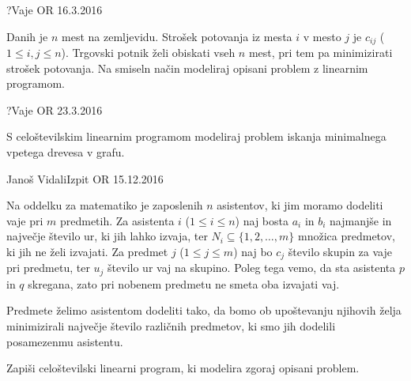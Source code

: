 \begin{naloga}{?}{Vaje OR 16.3.2016}
\begin{vprasanje}
Danih je $n$ mest na zemljevidu.
Strošek potovanja iz mesta $i$ v mesto $j$ je $c_{ij}$ ($1 \le i, j \le n$).
Trgovski potnik želi obiskati vseh $n$ mest,
pri tem pa minimizirati strošek potovanja.
Na smiseln način modeliraj opisani problem z linearnim programom.
\end{vprasanje}
\begin{odgovor}
\end{odgovor}
\end{naloga}


\begin{naloga}{?}{Vaje OR 23.3.2016}
\begin{vprasanje}
S celoštevilskim linearnim programom
modeliraj problem iskanja minimalnega vpetega drevesa v grafu.
\end{vprasanje}
\begin{odgovor}
\end{odgovor}
\end{naloga}


\begin{naloga}{Janoš Vidali}{Izpit OR 15.12.2016}
\begin{vprasanje}
Na oddelku za matematiko je zaposlenih $n$ asistentov,
ki jim moramo dodeliti vaje pri $m$ predmetih.
Za asistenta $i$ ($1 \le i \le n$) naj bosta $a_i$ in $b_i$
najmanjše in največje število ur, ki jih lahko izvaja,
ter $N_i \subseteq \{1, 2, \dots, m\}$ množica predmetov,
ki jih ne želi izvajati.
Za predmet $j$ ($1 \le j \le m$)
naj bo $c_j$ število skupin za vaje pri predmetu,
ter $u_j$ število ur vaj na skupino.
Poleg tega vemo, da sta asistenta $p$ in $q$ skregana,
zato pri nobenem predmetu ne smeta oba izvajati vaj.

Predmete želimo asistentom dodeliti tako,
da bomo ob upoštevanju njihovih želja
minimizirali največje število različnih predmetov,
ki smo jih dodelili posamezenmu asistentu.

Zapiši celoštevilski linearni program, ki modelira zgoraj opisani problem.
\end{vprasanje}
\begin{odgovor}
\end{odgovor}
\end{naloga}


